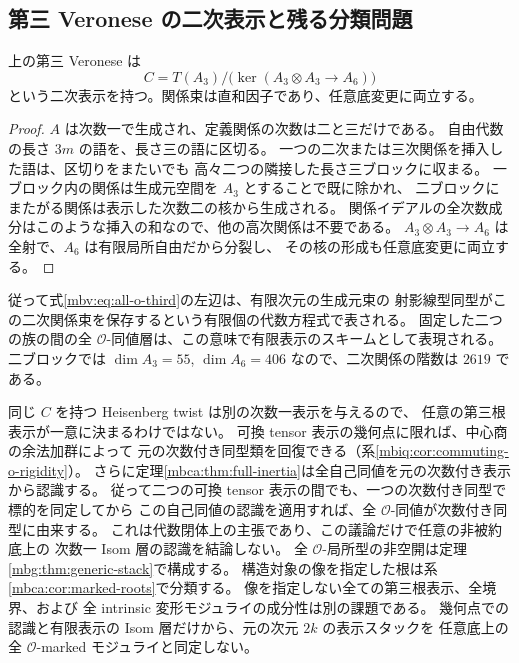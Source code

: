 \subsection{第三 Veronese の二次表示と残る分類問題}

\begin{lemma}[有限な二次表示]
\label{mbv:lem:quadratic}
上の第三 Veronese は
\[
 C=T(A_3)\big/\bigl(\ker(A_3\otimes A_3\longrightarrow A_6)\bigr)
\]
という二次表示を持つ。関係束は直和因子であり、任意底変更に両立する。
\end{lemma}
\begin{proof}
$A$ は次数一で生成され、定義関係の次数は二と三だけである。
自由代数の長さ $3m$ の語を、長さ三の語に区切る。
一つの二次または三次関係を挿入した語は、区切りをまたいでも
高々二つの隣接した長さ三ブロックに収まる。
一ブロック内の関係は生成元空間を $A_3$ とすることで既に除かれ、
二ブロックにまたがる関係は表示した次数二の核から生成される。
関係イデアルの全次数成分はこのような挿入の和なので、他の高次関係は不要である。
$A_3\otimes A_3\to A_6$ は全射で、$A_6$ は有限局所自由だから分裂し、
その核の形成も任意底変更に両立する。
\end{proof}

従って式\eqref{mbv:eq:all-o-third}の左辺は、有限次元の生成元束の
射影線型同型がこの二次関係束を保存するという有限個の代数方程式で表される。
固定した二つの族の間の全 $\mathcal O$-同値層は、この意味で有限表示のスキームとして表現される。
二ブロックでは $\dim A_3=55$, $\dim A_6=406$ なので、二次関係の階数は $2619$ である。

同じ $C$ を持つ Heisenberg twist は別の次数一表示を与えるので、
任意の第三根表示が一意に決まるわけではない。
可換 tensor 表示の幾何点に限れば、中心商の余法加群によって
元の次数付き同型類を回復できる（系\ref{mbiq:cor:commuting-o-rigidity}）。
さらに定理\ref{mbca:thm:full-inertia}は全自己同値を元の次数付き表示から認識する。
従って二つの可換 tensor 表示の間でも、一つの次数付き同型で標的を同定してから
この自己同値の認識を適用すれば、全 $\mathcal O$-同値が次数付き同型に由来する。
これは代数閉体上の主張であり、この議論だけで任意の非被約底上の
次数一 Isom 層の認識を結論しない。
全 $\mathcal O$-局所型の非空開は定理\ref{mbg:thm:generic-stack}で構成する。
構造対象の像を指定した根は系\ref{mbca:cor:marked-roots}で分類する。
像を指定しない全ての第三根表示、全境界、および
全 intrinsic 変形モジュライの成分性は別の課題である。
幾何点での認識と有限表示の Isom 層だけから、元の次元 $2k$ の表示スタックを
任意底上の全 $\mathcal O$-marked モジュライと同定しない。

